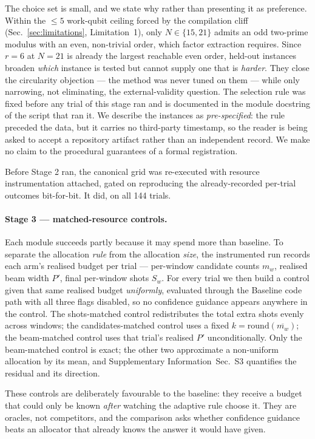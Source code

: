 \documentclass[preprint,11pt]{elsarticle}
\newcommand{\SI}{Supplementary Information}
\newcommand{\SItables}{\SI{}~Sec.~S3}
\begin{document}
The choice set is small, and we state why rather than presenting it as
preference. Within the ${\le}5$ work-qubit ceiling forced by the
compilation cliff (Sec.~\ref{sec:limitations}, Limitation~1), only
$N\in\{15,21\}$ admits an odd two-prime modulus with an even, non-trivial
order, which factor extraction requires. Since $r=6$ at $N=21$ is already
the largest reachable even order, held-out instances broaden \emph{which}
instance is tested but cannot supply one that is \emph{harder}. They
close the circularity objection --- the method was never tuned on them ---
while only narrowing, not eliminating, the external-validity question.
The selection rule was fixed before any trial of this stage ran and is
documented in the module docstring of the script that ran it. We describe
the instances as \emph{pre-specified}: the rule preceded the data, but
it carries no third-party timestamp, so the reader is being asked to
accept a repository artifact rather than an independent record. We make
no claim to the procedural guarantees of a formal registration.

Before Stage 2 ran, the canonical grid was re-executed with resource
instrumentation attached, gated on reproducing the already-recorded
per-trial outcomes bit-for-bit. It did, on all 144 trials.

\paragraph{Stage 3 --- matched-resource controls.} Each module succeeds
partly because it may spend more than baseline. To separate the
allocation \emph{rule} from the allocation \emph{size}, the instrumented
run records each arm's realised budget per trial --- per-window candidate
counts $m_w$, realised beam width $P'$, final per-window shots $S_w$. For
every trial we then build a control given that same realised budget
\emph{uniformly}, evaluated through the Baseline code path with all three
flags disabled, so no confidence guidance appears anywhere in the
control. The shots-matched control redistributes the total extra shots
evenly across windows; the candidates-matched control uses a fixed
$k=\mathrm{round}(\overline{m_w})$; the beam-matched control uses that
trial's realised $P'$ unconditionally. Only the beam-matched control is
exact; the other two approximate a non-uniform allocation by its mean,
and \SItables{} quantifies the residual and its direction.

These controls are deliberately favourable to the baseline: they receive
a budget that could only be known \emph{after} watching the adaptive rule
choose it. They are oracles, not competitors, and the comparison asks
whether confidence guidance beats an allocator that already knows the
answer it would have given.
\end{document}
